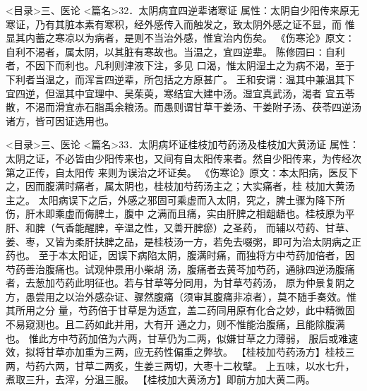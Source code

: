 \documentclass[a4paper,12pt,UTF8,twoside]{ctexbook}
\begin{document}
<目录>三、医论
<篇名>32．太阴病宜四逆辈诸寒证
属性：太阴自少阳传来原无寒证，乃有其脏本素有寒积，经外感传入而触发之，致太阴外感之证不显，而 
惟显其内蓄之寒凉以为病者，是则不当治外感，惟宜治内伤矣。 
《伤寒沦》原文∶自利不渴者，属太阴，以其脏有寒故也。当温之，宜四逆辈。 
陈修园曰∶自利者，不因下而利也。凡利则津液下注，多见 
口渴，惟太阴湿土之为病不渴，至于下利者当温之，而浑言四逆辈，所包括之方原甚广。 
王和安谓∶温其中兼温其下宜四逆，但温其中宜理中、吴茱萸，寒结宜大建中汤。湿宜真武汤，渴者 
宜五苓散，不渴而滑宜赤石脂禹余粮汤。而愚则谓甘草干姜汤、干姜附子汤、茯苓四逆汤诸方，皆可因证选用也。 

<目录>三、医论
<篇名>33．太阴病坏证桂枝加芍药汤及桂枝加大黄汤证
属性：太阴之证，不必皆由少阳传来也，又间有自太阳传来者。然自少阳传来，为传经次第之正传，自太阳传 
来则为误治之坏证矣。 
《伤寒论》原文∶本太阳病，医反下之，因而腹满时痛者，属太阴也，桂枝加芍药汤主之；大实痛者，桂 
枝加大黄汤主之。 
太阳病误下之后，外感之邪固可乘虚而入太阴，究之，脾土骤为降下所伤，肝木即乘虚而侮脾土，腹中 
之满而且痛，实由肝脾之相龃龉也。桂枝原为平肝、和脾（气香能醒脾，辛温之性，又善开脾瘀）之圣药， 
而辅以芍药、甘草、姜、枣，又皆为柔肝扶脾之品，是桂枝汤一方，若免去啜粥，即可为治太阴病之正药也。 
至于本太阳证，因误下病陷太阴，腹满时痛，而独将方中芍药加倍者，因芍药善治腹痛也。试观仲景用小柴胡 
汤，腹痛者去黄芩加芍药，通脉四逆汤腹痛者，去葱加芍药此明征也。若与甘草等分同用，为甘草芍药汤， 
原为仲景复阴之方，愚尝用之以治外感杂证、骤然腹痛（须审其腹痛非凉者），莫不随手奏效。惟其所用之分 
量，芍药倍于甘草是为适宜，盖二药同用原有化合之妙，此中精微固不易窥测也。且二药如此并用，大有开 
通之力，则不惟能治腹痛，且能除腹满也。 
惟此方中芍药加倍为六两，甘草仍为二两，似嫌甘草之力薄弱， 
服后或难速效，拟将甘草亦加重为三两，应无药性偏重之弊欤。 
【桂枝加芍药汤方】桂枝三两，芍药六两，甘草二两炙，生姜三两切，大枣十二枚擘。 
上五味，以水七升，煮取三升，去滓，分温三服。 
【桂枝加大黄汤方】即前方加大黄二两。 
\end{document}
